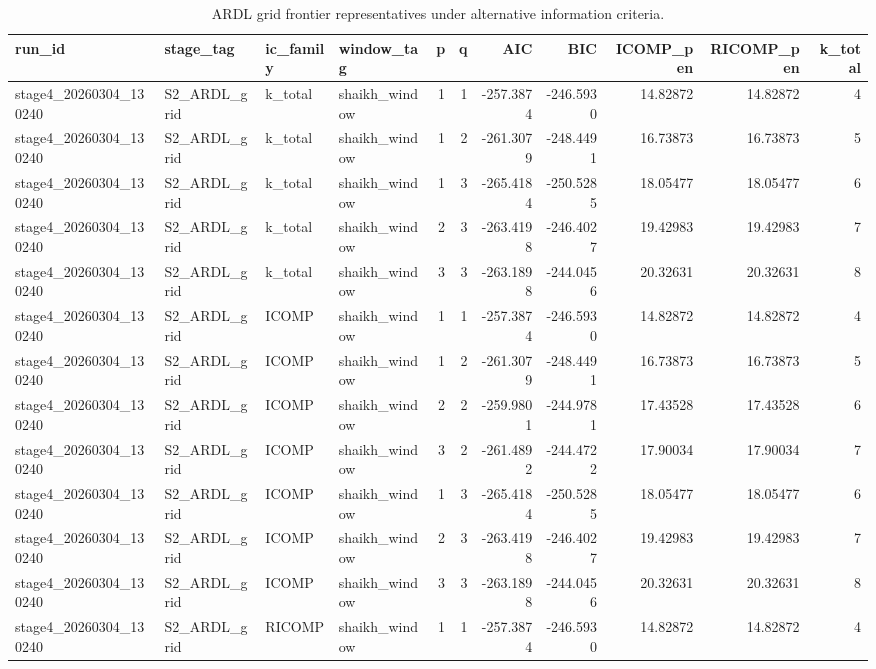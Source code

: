 \begin{table}[!h]
\centering
\caption{ARDL grid frontier representatives under alternative information criteria.}
\centering
\begin{threeparttable}
\begin{tabular}[t]{llllrrrrrrr}
\toprule
run\_id & stage\_tag & ic\_family & window\_tag & p & q & AIC & BIC & ICOMP\_pen & RICOMP\_pen & k\_total\\
\midrule
stage4\_20260304\_130240 & S2\_ARDL\_grid & k\_total & shaikh\_window & 1 & 1 & -257.3874 & -246.5930 & 14.82872 & 14.82872 & 4\\
stage4\_20260304\_130240 & S2\_ARDL\_grid & k\_total & shaikh\_window & 1 & 2 & -261.3079 & -248.4491 & 16.73873 & 16.73873 & 5\\
stage4\_20260304\_130240 & S2\_ARDL\_grid & k\_total & shaikh\_window & 1 & 3 & -265.4184 & -250.5285 & 18.05477 & 18.05477 & 6\\
stage4\_20260304\_130240 & S2\_ARDL\_grid & k\_total & shaikh\_window & 2 & 3 & -263.4198 & -246.4027 & 19.42983 & 19.42983 & 7\\
stage4\_20260304\_130240 & S2\_ARDL\_grid & k\_total & shaikh\_window & 3 & 3 & -263.1898 & -244.0456 & 20.32631 & 20.32631 & 8\\
\addlinespace
stage4\_20260304\_130240 & S2\_ARDL\_grid & ICOMP & shaikh\_window & 1 & 1 & -257.3874 & -246.5930 & 14.82872 & 14.82872 & 4\\
stage4\_20260304\_130240 & S2\_ARDL\_grid & ICOMP & shaikh\_window & 1 & 2 & -261.3079 & -248.4491 & 16.73873 & 16.73873 & 5\\
stage4\_20260304\_130240 & S2\_ARDL\_grid & ICOMP & shaikh\_window & 2 & 2 & -259.9801 & -244.9781 & 17.43528 & 17.43528 & 6\\
stage4\_20260304\_130240 & S2\_ARDL\_grid & ICOMP & shaikh\_window & 3 & 2 & -261.4892 & -244.4722 & 17.90034 & 17.90034 & 7\\
stage4\_20260304\_130240 & S2\_ARDL\_grid & ICOMP & shaikh\_window & 1 & 3 & -265.4184 & -250.5285 & 18.05477 & 18.05477 & 6\\
\addlinespace
stage4\_20260304\_130240 & S2\_ARDL\_grid & ICOMP & shaikh\_window & 2 & 3 & -263.4198 & -246.4027 & 19.42983 & 19.42983 & 7\\
stage4\_20260304\_130240 & S2\_ARDL\_grid & ICOMP & shaikh\_window & 3 & 3 & -263.1898 & -244.0456 & 20.32631 & 20.32631 & 8\\
stage4\_20260304\_130240 & S2\_ARDL\_grid & RICOMP & shaikh\_window & 1 & 1 & -257.3874 & -246.5930 & 14.82872 & 14.82872 & 4\\

\end{tabular}
\end{threeparttable}
\end{table}
